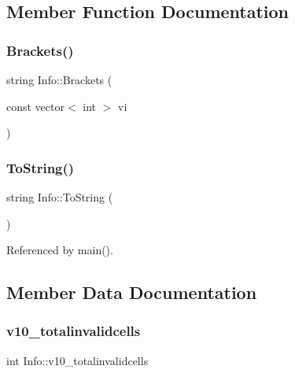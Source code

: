 \subsection{Member Function Documentation}
\mbox{\label{structInfo_a4f0c8708a9cd7b28ebb45b820d493807}} 
\subsubsection{\texorpdfstring{Brackets()}{Brackets()}}
{\footnotesize\ttfamily string Info\+::\+Brackets (\begin{DoxyParamCaption}\item[{const vector$<$ int $>$}]{vi }\end{DoxyParamCaption})\hspace{0.3cm}{\ttfamily [inline]}}

\mbox{\label{structInfo_a4f08e2630f96401302b19fd0367974cd}} 
\subsubsection{\texorpdfstring{To\+String()}{ToString()}}
{\footnotesize\ttfamily string Info\+::\+To\+String (\begin{DoxyParamCaption}{ }\end{DoxyParamCaption})\hspace{0.3cm}{\ttfamily [inline]}}



Referenced by main().



\subsection{Member Data Documentation}
\mbox{\label{structInfo_a8f22dfe0a01d67f48cf29df01bcbbbc6}} 
\subsubsection{\texorpdfstring{v10\+\_\+totalinvalidcells}{v10\_totalinvalidcells}}
{\footnotesize\ttfamily int Info\+::v10\+\_\+totalinvalidcells}




